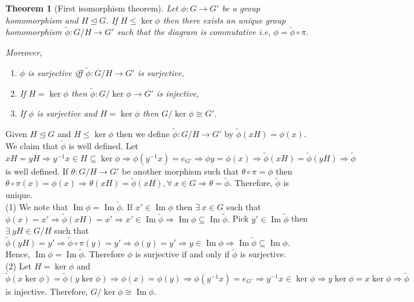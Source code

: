 \documentclass[11pt]{amsart}
\newtheorem{theorem}{Theorem}[section]
\DeclareMathOperator{\im}{\text{Im}}
\begin{document}
\begin{theorem}[First isomorphism theorem]
Let $\phi:G\to G'$ be a group homomorphism and $H\unlhd G$. If $H\leq \ker\phi$ then there exists an unique group homomorphism $\tilde{\phi}:G/H\to G'$ such that the diagram is commutative i.e, $\phi=\tilde{\phi}\circ \pi.$
\begin{center}
\end{center}
Moreover, \begin{enumerate}
\item $\phi$ is surjective iff $\tilde{\phi}:G/H\to G'$ is surjective,
\item If $H=\ker\phi$ then $\tilde{\phi}:G/\ker\phi\to G'$ is injective,
\item If $\phi$ is surjective and $H=\ker\phi$ then $G/\ker\phi\cong G'.$
\end{enumerate}
\end{theorem}
\proof Given $H\unlhd G$ and $H\leq \ker\phi$ then we define $\tilde{\phi}:G/H\to G'$ by $\tilde{\phi}(xH)=\phi(x).$ We claim that $\tilde{\phi}$ is well defined. Let $xH=yH \Rightarrow y^{-1}x\in H\subseteq \ker\phi \Rightarrow \phi(y^{-1}x)=e_{G'} \Rightarrow \phi{y}=\phi(x) \Rightarrow \tilde{\phi}(xH)=\tilde{\phi}(yH) \Rightarrow \tilde{\phi}$ is well defined. If $\theta:G/H\to G'$ be another morphism such that $\theta\circ \pi=\phi$ then $\theta\circ \pi(x)=\phi(x) \Rightarrow \theta(xH)=\tilde{\phi}(xH),\forall~x\in G \Rightarrow \theta=\tilde{\phi}. $ Therefore, $\tilde{\phi}$ is unique.\\
(1) We note that $\im \phi=\im\tilde{\phi}.$ If $x'\in \im \phi$ then $\exists~x\in G$ such that $\phi(x)=x' \Rightarrow \tilde{\phi}(xH)=x' \Rightarrow x'\in \im\tilde{\phi} \Rightarrow \im \phi\subseteq\im \tilde{\phi}.$ Pick $y'\in \im\tilde{\phi}$ then $\exists~yH\in G/H$ such that $\tilde{\phi}(yH)=y' \Rightarrow\tilde{\phi}\circ \pi(y)=y' \Rightarrow\phi(y)=y' \Rightarrow y\in \im\phi \Rightarrow \im\tilde{\phi}\subseteq \im\phi.$ Hence, $\im\phi=\im\tilde{\phi}.$ Therefore $\phi$ is surjective if and only if $\tilde{\phi}$ is surjective.\\
(2) Let $H=\ker\phi$ and $\tilde{\phi}(x\ker\phi)=\tilde{\phi}(y\ker\phi) \Rightarrow \phi(x)=\phi(y) \Rightarrow \phi(y^{-1}x)=e_{G'} \Rightarrow y^{-1}x\in \ker\phi \Rightarrow y\ker\phi=x\ker\phi \Rightarrow \tilde{\phi}$ is injective. Therefore, $G/\ker\phi\cong \im\phi.$\\
\end{document}
